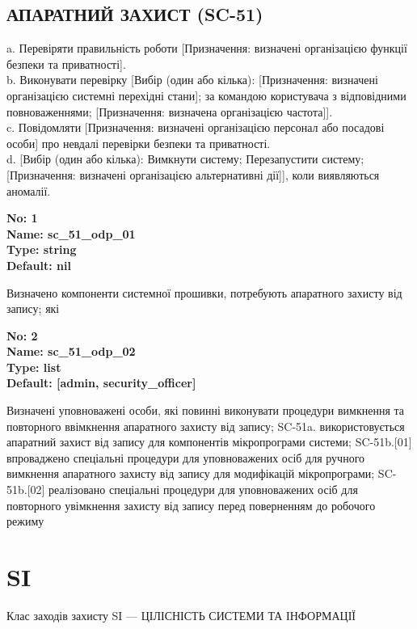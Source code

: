 \documentclass{article}
\begin{document}
\subsection{АПАРАТНИЙ ЗАХИСТ (SC-51)}
a. Перевіряти правильність роботи [Призначення: визначені організацією функції безпеки та приватності].\\ 
b. Виконувати перевірку [Вибір (один або кілька): [Призначення: визначені організацією системні перехідні стани]; за командою користувача з відповідними повноваженнями; [Призначення: визначена організацією частота]].\\ 
c. Повідомляти [Призначення: визначені організацією персонал або посадові особи] про невдалі перевірки безпеки та приватності.\\ 
d. [Вибір (один або кілька): Вимкнути систему; Перезапустити систему; [Призначення: визначені організацією альтернативні дії]], коли виявляються аномалії.

\vspace{10pt}
{\footnotesize\bfseries
No: 1\\
Name: sc\_\allowbreak{}51\_\allowbreak{}odp\_\allowbreak{}01\\
Type: string\\
Default: nil
}

{\footnotesize Визначено компоненти системної прошивки, потребують апаратного захисту від запису; які}


{\footnotesize\bfseries
No: 2\\
Name: sc\_\allowbreak{}51\_\allowbreak{}odp\_\allowbreak{}02\\
Type: list\\
Default: [\textquotedbl{}admin\textquotedbl{}, \textquotedbl{}security\_\allowbreak{}officer\textquotedbl{}]
}

{\footnotesize Визначені уповноважені особи, які повинні виконувати процедури вимкнення та повторного ввімкнення апаратного захисту від запису; SC-51a. використовується апаратний захист від запису для компонентів мікропрограми системи; SC-51b.[01] впроваджено спеціальні процедури для уповноважених осіб для ручного вимкнення апаратного захисту від запису для модифікацій мікропрограми; SC-51b.[02] реалізовано спеціальні процедури для уповноважених осіб для повторного увімкнення захисту від запису перед поверненням до робочого режиму}




\section{SI}
Клас заходів захисту SI --- ЦІЛІСНІСТЬ СИСТЕМИ ТА ІНФОРМАЦІЇ
\end{document}
